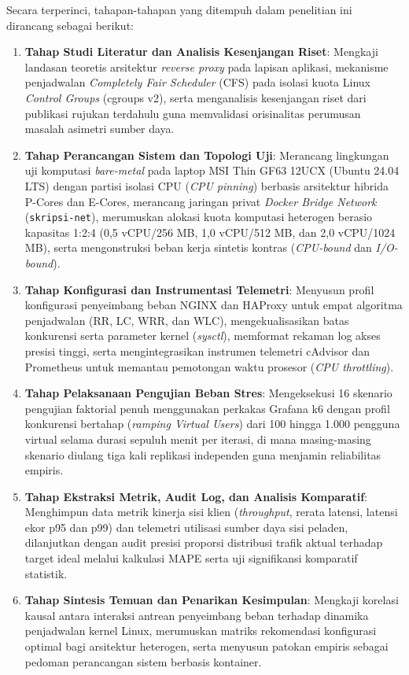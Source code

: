 Secara terperinci, tahapan-tahapan yang ditempuh dalam penelitian ini dirancang sebagai berikut:
\begin{enumerate}
    \item \textbf{Tahap Studi Literatur dan Analisis Kesenjangan Riset}: Mengkaji landasan teoretis arsitektur \textit{reverse proxy} pada lapisan aplikasi, mekanisme penjadwalan \textit{Completely Fair Scheduler} (CFS) pada isolasi kuota Linux \textit{Control Groups} (cgroups v2), serta menganalisis kesenjangan riset dari publikasi rujukan terdahulu guna memvalidasi orisinalitas perumusan masalah asimetri sumber daya.
    \item \textbf{Tahap Perancangan Sistem dan Topologi Uji}: Merancang lingkungan uji komputasi \textit{bare-metal} pada laptop MSI Thin GF63 12UCX (Ubuntu 24.04 LTS) dengan partisi isolasi CPU (\textit{CPU pinning}) berbasis arsitektur hibrida P-Cores dan E-Cores, merancang jaringan privat \textit{Docker Bridge Network} (\texttt{skripsi-net}), merumuskan alokasi kuota komputasi heterogen berasio kapasitas 1:2:4 (0,5 vCPU/256 MB, 1,0 vCPU/512 MB, dan 2,0 vCPU/1024 MB), serta mengonstruksi beban kerja sintetis kontras (\textit{CPU-bound} dan \textit{I/O-bound}).
    \item \textbf{Tahap Konfigurasi dan Instrumentasi Telemetri}: Menyusun profil konfigurasi penyeimbang beban NGINX dan HAProxy untuk empat algoritma penjadwalan (RR, LC, WRR, dan WLC), mengekualisasikan batas konkurensi serta parameter kernel (\textit{sysctl}), memformat rekaman log akses presisi tinggi, serta mengintegrasikan instrumen telemetri cAdvisor dan Prometheus untuk memantau pemotongan waktu prosesor (\textit{CPU throttling}).
    \item \textbf{Tahap Pelaksanaan Pengujian Beban Stres}: Mengeksekusi 16 skenario pengujian faktorial penuh menggunakan perkakas Grafana k6 dengan profil konkurensi bertahap (\textit{ramping Virtual Users}) dari 100 hingga 1.000 pengguna virtual selama durasi sepuluh menit per iterasi, di mana masing-masing skenario diulang tiga kali replikasi independen guna menjamin reliabilitas empiris.
    \item \textbf{Tahap Ekstraksi Metrik, Audit Log, dan Analisis Komparatif}: Menghimpun data metrik kinerja sisi klien (\textit{throughput}, rerata latensi, latensi ekor p95 dan p99) dan telemetri utilisasi sumber daya sisi peladen, dilanjutkan dengan audit presisi proporsi distribusi trafik aktual terhadap target ideal melalui kalkulasi MAPE serta uji signifikansi komparatif statistik.
    \item \textbf{Tahap Sintesis Temuan dan Penarikan Kesimpulan}: Mengkaji korelasi kausal antara interaksi antrean penyeimbang beban terhadap dinamika penjadwalan kernel Linux, merumuskan matriks rekomendasi konfigurasi optimal bagi arsitektur heterogen, serta menyusun patokan empiris sebagai pedoman perancangan sistem berbasis kontainer.
\end{enumerate}

